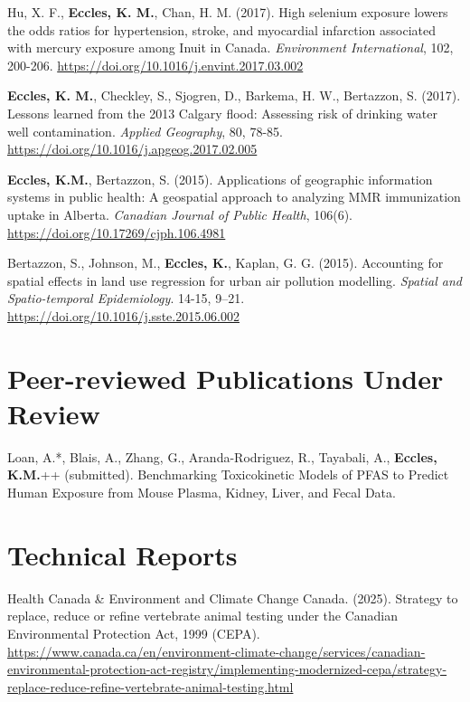 \documentclass[margin,line]{res}
\begin{document}
\begin{resume}
Hu, X. F., \textbf{Eccles, K. M.}, Chan, H. M. (2017). High selenium exposure lowers the odds ratios for hypertension, stroke, and myocardial infarction associated with mercury exposure among Inuit in Canada. \textit{Environment International}, 102, 200-206. \url{https://doi.org/10.1016/j.envint.2017.03.002}

\textbf{Eccles, K. M.}, Checkley, S., Sjogren, D., Barkema, H. W., Bertazzon, S. (2017). Lessons learned from the 2013 Calgary flood: Assessing risk of drinking water well contamination. \textit{Applied Geography}, 80, 78-85. \url{https://doi.org/10.1016/j.apgeog.2017.02.005}

\textbf{Eccles, K.M.}, Bertazzon, S. (2015). Applications of geographic information systems in public health: A geospatial approach to analyzing MMR immunization uptake in Alberta. \textit{Canadian Journal of Public Health}, 106(6). \url{https://doi.org/10.17269/cjph.106.4981}

Bertazzon, S., Johnson, M., \textbf{Eccles, K.}, Kaplan, G. G. (2015). Accounting for spatial effects in land use regression for urban air pollution modelling. \textit{Spatial and Spatio-temporal Epidemiology}. 14-15, 9–21. \url{https://doi.org/10.1016/j.sste.2015.06.002}

\section{\sc Peer-reviewed Publications Under Review}

Loan, A.*, Blais, A., Zhang, G., Aranda-Rodriguez, R., Tayabali, A., \textbf{Eccles, K.M.}++ (submitted). Benchmarking Toxicokinetic Models of PFAS to Predict Human Exposure from Mouse Plasma, Kidney, Liver, and Fecal Data.



\vspace*{.1in}
\section{\sc Technical Reports}
Health Canada \& Environment and Climate Change Canada. (2025). Strategy to replace, reduce or refine vertebrate animal testing under the Canadian Environmental Protection Act, 1999 (CEPA). \url{https://www.canada.ca/en/environment-climate-change/services/canadian-environmental-protection-act-registry/implementing-modernized-cepa/strategy-replace-reduce-refine-vertebrate-animal-testing.html}


\end{resume}
\end{document}
